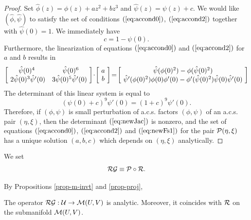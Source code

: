 \begin{proof}
Set 
 $\hat{\phi}(z)=\phi(z)+a z^2+b z^3$ and $\hat{\psi}(z)=\psi(z)+c$.
We would like $(\hat{\phi},\hat{\psi})$ to satisfy the set of conditions  $(\ref{eq:accond0})$, $(\ref{eq:accond2})$ together with $\hat{\psi}(0)=1$. We immediately have
\begin{equation}\label{eq:newFs1}
c=1-\psi(0).
\end{equation}
Furthermore, the linearization of equations  $(\ref{eq:accond0})$ and $(\ref{eq:accond2})$ for $a$ and $b$ results in
\begin{equation} \label{eq:newFs2}
\left[\!
\begin{array}{c c}
\hat{\psi}(0)^{4} \  & \ \hat{\psi}(0)^{6}   \\
 2 \hat{\psi}(0)^{3}  \hat{\psi}'(0)   &   3 \hat{\psi}(0)^{5} \hat{\psi}'(0)
\end{array}
\!\right]\! \cdot \!
\left[\!
\begin{array}{c}
a \\
b
\end{array}
\!\right]\!=\!
\left[\!
\begin{array}{c}
\hat{\psi}(\phi(0)^2)-\phi(\hat{\psi}(0)^2) \\
\hat{\psi}'(\phi(0)^2) \phi(0) \phi'(0)-\phi'(\hat{\psi}(0)^2) \hat{\psi}(0) \hat{\psi}'(0)
\end{array}
\!\right]
\end{equation}
The determinant of this linear system  is equal to
\begin{equation}\label{eq:newJac}
(\psi(0)+c)^{9} \psi'(0)=(1+c)^{9} \psi'(0).
\end{equation}
Therefore, if $(\phi,\psi)$ is small perturbation of a.c.s. factors $(\phi,\psi)$ of an a.c.s. pair $(\eta,\xi)$, then the determinant $(\ref{eq:newJac})$ is nonzero, and the set of equations $(\ref{eq:accond0})$, $(\ref{eq:accond2})$ and $(\ref{eq:newFs1})$ for the pair $\mathcal{P} (\eta,\xi)$ has a unique solution $(a,b,c)$ which depends on $(\eta,\xi)$ analytically.

\end{proof}

\begin{defn}
We set $$\mathcal{RG}\equiv \mathcal{P} \circ \mathcal{R}.$$
\end{defn}
By Propositions \ref{prop-m-invt} and \ref{prop-proj},
\begin{cor}
The operator $\mathcal{RG}:\mathcal{U}\to\mathcal{M}(U,V)$ is analytic. Moreover, it coincides with $\mathcal{R}$ on the submanifold $\mathcal{M}(U,V)$.
\end{cor}



